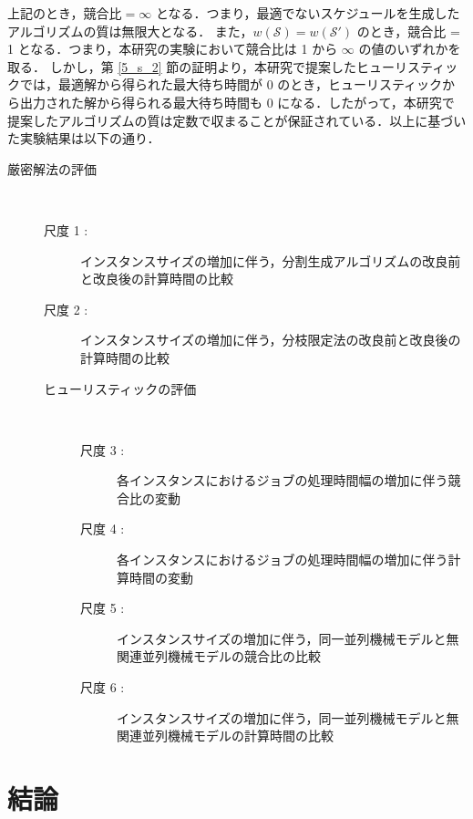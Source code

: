 \documentclass[12pt]{optlab-bachelor}
\begin{document}
上記のとき，$\text{競合比} = \infty$ となる．つまり，最適でないスケジュールを生成したアルゴリズムの質は無限大となる．
また，$w(\mathcal{S}) = w(\mathcal{S}')$ のとき，競合比 = 1 となる．つまり，本研究の実験において競合比は 1 から $\infty$ の値のいずれかを取る．
しかし，第 \ref{5_s_2} 節の証明より，本研究で提案したヒューリスティックでは，最適解から得られた最大待ち時間が 0 のとき，ヒューリスティックから出力された解から得られる最大待ち時間も 0 になる．したがって，本研究で提案したアルゴリズムの質は定数で収まることが保証されている．以上に基づいた実験結果は以下の通り．
\begin{description}
  \item[厳密解法の評価] ~
  \begin{description}
    \item[尺度 1 :] インスタンスサイズの増加に伴う，分割生成アルゴリズムの改良前と改良後の計算時間の比較
    \item[尺度 2 :] インスタンスサイズの増加に伴う，分枝限定法の改良前と改良後の計算時間の比較
    \item[ヒューリスティックの評価] ~
    \begin{description}
      \item[尺度 3 :] 各インスタンスにおけるジョブの処理時間幅の増加に伴う競合比の変動
      \item[尺度 4 :] 各インスタンスにおけるジョブの処理時間幅の増加に伴う計算時間の変動
      \item[尺度 5 :] インスタンスサイズの増加に伴う，同一並列機械モデルと無関連並列機械モデルの競合比の比較
      \item[尺度 6 :] インスタンスサイズの増加に伴う，同一並列機械モデルと無関連並列機械モデルの計算時間の比較
    \end{description}

  \end{description}
\end{description}

\chapter{結論}\label{c_6}
\end{document}
